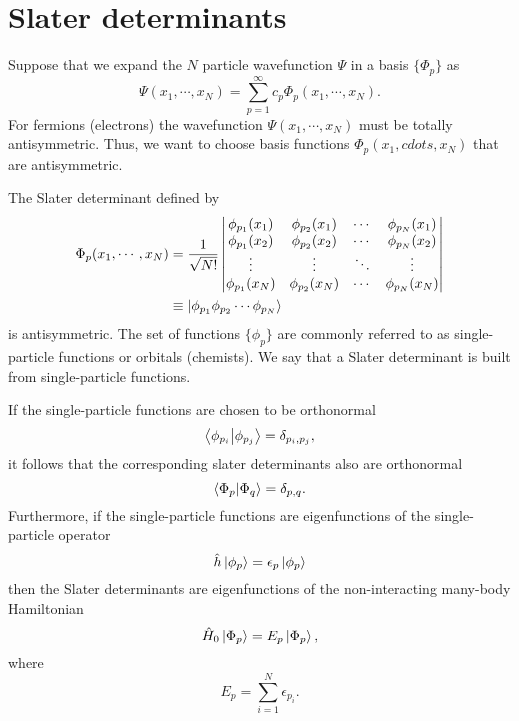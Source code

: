 \documentclass[superscriptaddress,unsortedaddress,
 amsmath,amssymb,
 aps,
]{revtex4-2}
\begin{document}
\section{Slater determinants}
Suppose that we expand the $N$ particle wavefunction $\Psi$ in a basis $\{ \Phi_p \}$ as 
\begin{equation}
    \Psi(x_1,\cdots,x_N) = \sum_{p=1}^\infty c_p \Phi_p(x_1, \cdots, x_N).
\end{equation}
For fermions (electrons) the wavefunction $\Psi(x_1,\cdots,x_N)$ must be totally antisymmetric. Thus, we want to choose basis functions $\Phi_p(x_1,cdots,x_N)$ that are antisymmetric.

The Slater determinant defined by 
\begin{align}
    \Phi_p(x_1, \cdots, x_N) &= \frac{1}{\sqrt{N!}}
    \begin{vmatrix}
    \phi_{p_1}(x_1) & \phi_{p_2}(x_1) & \cdots & \phi_{p_N}(x_1) \\
    \phi_{p_1}(x_2) & \phi_{p_2}(x_2) & \cdots & \phi_{p_N}(x_2) \\
    \vdots & \vdots & \ddots & \vdots \\
    \phi_{p_1}(x_N) & \phi_{p_2}(x_N) & \cdots & \phi_{p_N}(x_N) \\
    \end{vmatrix} \\
    &\equiv \ket{\phi_{p_1} \phi_{p_2}\cdots \phi_{p_N}}
\end{align}
is antisymmetric. 
The set of functions $\{ \phi_p \}$ are commonly referred to as single-particle functions or orbitals (chemists). We say that a Slater determinant is built from single-particle functions.

If the single-particle functions are chosen to be orthonormal
\begin{equation}
    \braket{\phi_{p_i}}{\phi_{p_j}} = \delta_{p_i, p_j},
\end{equation}
it follows that the corresponding slater determinants also are orthonormal
\begin{equation}
    \braket{\Phi_p}{\Phi_q} = \delta_{p,q}.
\end{equation}
Furthermore, if the single-particle functions are eigenfunctions of the single-particle operator
\begin{equation}
    \hat{h}\ket{\phi_p} = \epsilon_p \ket{\phi_p}
\end{equation}
then the Slater determinants are eigenfunctions of the non-interacting many-body Hamiltonian
\begin{equation}
    \hat{H}_0 \ket{\Phi_p} = E_p \ket{\Phi_p},
\end{equation}
where 
\begin{equation}
    E_p = \sum_{i=1}^N \epsilon_{p_i}.
\end{equation}
\end{document}
